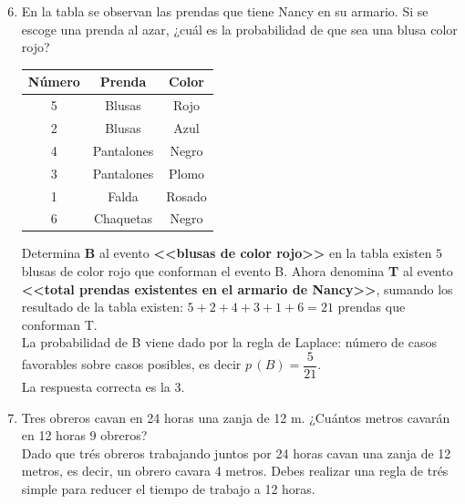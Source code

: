 \documentclass[11pt, a4paper]{article} %
\theoremstyle{dotlessP}
\theoremstyle{dotlessS}
\begin{document}
\begin{enumerate}[label=\color{dg}\theenumi.]
 \setcounter{enumi}{5}
  \normalsize
   \item {\color{db}En la tabla se observan las 			prendas que tiene Nancy en su armario. Si se 			escoge 	una prenda al azar, ¿cuál es la 				probabilidad de que 	sea una blusa color rojo?
        }
        
	\begin{table}[htbp]
		\centering
		\label{my-label}
	\begin{tabular}{|c|c|c|}
		\hline
		\textbf{Número} & \textbf{Prenda} & 					\textbf{Color} \\ \hline
		5               & Blusas          & Rojo         		  \\ \hline
		2               & Blusas          & Azul          		 \\ \hline
		4               & Pantalones      & Negro          \\ 		\hline
		3               & Pantalones      & Plomo          \\ 		\hline
		1               & Falda           & Rosado         \\ 		\hline
		6               & Chaquetas       & Negro          \\ 		\hline
	\end{tabular}
	\end{table}
    Determina \textbf{B} al evento \textbf{<<blusas de 			color rojo>>} en la tabla existen \(5\) blusas de color 	rojo que conforman el evento B. Ahora denomina \textbf{T} 		al evento \textbf{<<total prendas existentes en el 		armario de Nancy>>}, sumando los resultado de la tabla 		existen: \(5 + 2 + 4 + 3 + 1 + 6 = 21\) prendas que 		conforman T.
	\\
	La probabilidad de B viene dado por la regla de Laplace: 	número de casos favorables sobre casos posibles, es decir 		\textbf {\(p\,(B) = \dfrac{5}{21}.\)}\\
	{\color{dh} La respuesta correcta es la 3.}
	\\
	\item {\color{db} Tres obreros cavan en 24 horas una 		zanja de 12 m. ¿Cuántos metros cavarán en 12 horas 9 		obreros?
        }
	\\ Dado que trés obreros  trabajando juntos por 24 horas 	cavan una zanja de 12 metros, es decir, un obrero cavara 4 		metros.  Debes realizar una regla de trés simple para 		reducer el tiempo de trabajo a  12 horas.       

\end{enumerate}
\end{document}
